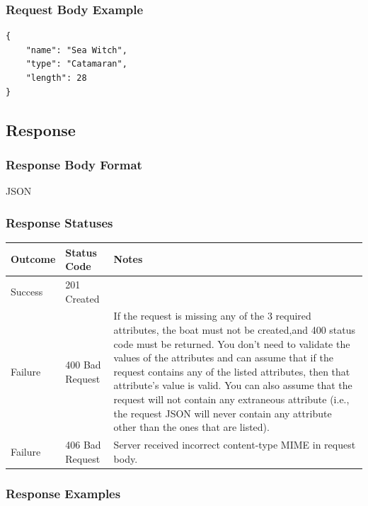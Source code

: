 \documentclass[letterpaper,11pt,titlepage,draftclsnofoot,onecolumn,compsoc,utf8,latin1]{IEEEtran}
\begin{document}
\begin{singlespace}
\subsubsection{Request Body Example}

\begin{lstlisting}[]
{
    "name": "Sea Witch",
    "type": "Catamaran",
    "length": 28
}
\end{lstlisting}

\subsection{Response}
\subsubsection{Response Body Format}

JSON

\subsubsection{Response Statuses}

\begin{center}
\begin{tabular}{ |p{}|p{}|p{}| } 
 \hline
 \textbf{Outcome} & \textbf{Status Code} & \textbf{Notes}  \\  \hline
 Success & 201 Created &  \\ \hline
 Failure & 400 Bad Request &  
 If the request is missing any of the 3 required attributes, the boat must not be created,and 400 status code must be returned.\vspace{.2cm}
 You don’t need to validate the values of the attributes and can assume that if the request contains any of the listed attributes, then that attribute’s value is valid.\vspace{.2cm}
 You can also assume that the request will not contain any extraneous attribute (i.e., the request JSON will never contain any attribute other than the ones that are listed).\\ \hline
 Failure & 406 Bad Request & Server received incorrect content-type MIME in request body.\\
 \hline
\end{tabular}
\end{center}

\subsubsection{Response Examples}


\end{singlespace}
\end{document}
